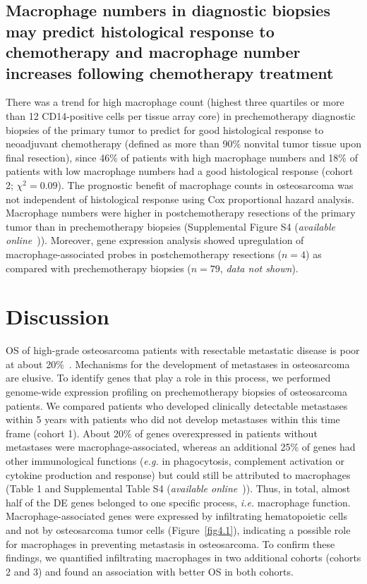 \subsection{Macrophage numbers in diagnostic biopsies may
predict histological response to chemotherapy and
macrophage number increases following
chemotherapy treatment}
There was a trend for high macrophage count (highest three
quartiles or more than 12 CD14\hyp{}positive cells per tissue
array core) in prechemotherapy diagnostic biopsies of the
primary tumor to predict for good histological response to
neoadjuvant chemotherapy (defined as more than 90\%
nonvital tumor tissue upon final resection), since 46\% of
patients with high macrophage numbers and 18\% of
patients with low macrophage numbers had a good histological
response (cohort 2; $\chi^2=0.09$). The prognostic
benefit of macrophage counts in osteosarcoma was not
independent of histological response using Cox proportional
hazard analysis. Macrophage numbers were higher
in postchemotherapy resections of the primary tumor than
in prechemotherapy biopsies (Supplemental Figure S4 ({\it available online}~\cite{ch4additional})).
Moreover, gene expression analysis showed upregulation
of macrophage\hyp{}associated probes in postchemotherapy
resections ($n=4$) as compared with prechemotherapy
biopsies ($n=79$, {\it data not shown}).

\section{Discussion}\label{discussion4}
OS of high-grade osteosarcoma patients with resectable
metastatic disease is poor at about 20\%~\cite{buddingh2010prognostic}. Mechanisms
for the development of metastases in osteosarcoma are
elusive. To identify genes that play a role in this process,
we performed genome\hyp{}wide expression profiling on
prechemotherapy biopsies of osteosarcoma patients. We
compared patients who developed clinically detectable
metastases within 5 years with patients who did not
develop metastases within this time frame (cohort 1).
About 20\% of genes overexpressed in patients without
metastases were macrophage\hyp{}associated, whereas an additional
25\% of genes had other immunological functions
({\it e.g.} in phagocytosis, complement activation or cytokine
production and response) but could still be attributed to
macrophages (Table 1 and Supplemental Table S4 ({\it available online}~\cite{ch4additional})). Thus,
in total, almost half of the DE genes belonged to one specific
process, {\it i.e.} macrophage function. Macrophage\hyp{}associated
genes were expressed by infiltrating hematopoietic cells
and not by osteosarcoma tumor cells (Figure~\ref{fig4.1}), indicating
a possible role for macrophages in preventing metastasis in
osteosarcoma. To confirm these findings, we quantified
infiltrating macrophages in two additional cohorts (cohorts 2
and 3) and found an association with better OS in both
cohorts.

